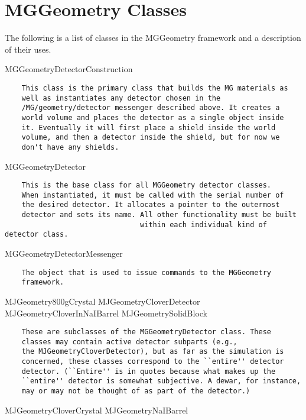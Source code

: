 \section{MGGeometry Classes}

 The following is a list of classes in the MGGeometry framework and
a description of their uses.


MGGeometryDetectorConstruction
 
\begin{lstlisting}
    This class is the primary class that builds the MG materials as
    well as instantiates any detector chosen in the
    /MG/geometry/detector messenger described above. It creates a
    world volume and places the detector as a single object inside
    it. Eventually it will first place a shield inside the world
    volume, and then a detector inside the shield, but for now we
    don't have any shields.
   \end{lstlisting}

MGGeometryDetector

\begin{lstlisting}
    This is the base class for all MGGeometry detector classes.
    When instantiated, it must be called with the serial number of
    the desired detector. It allocates a pointer to the outermost
    detector and sets its name. All other functionality must be built
                                within each individual kind of detector class.
   \end{lstlisting}
MGGeometryDetectorMessenger
 
\begin{lstlisting}
    The object that is used to issue commands to the MGGeometry
    framework.
   \end{lstlisting}
MJGeometry800gCrystal MJGeometryCloverDetector MJGeometryCloverInNaIBarrel MJGeometrySolidBlock
 
\begin{lstlisting}
    These are subclasses of the MGGeometryDetector class. These
    classes may contain active detector subparts (e.g.,
    the MJGeometryCloverDetector), but as far as the simulation is
    concerned, these classes correspond to the ``entire'' detector
    detector. (``Entire'' is in quotes because what makes up the
    ``entire'' detector is somewhat subjective. A dewar, for instance,
    may or may not be thought of as part of the detector.)
   \end{lstlisting}
    MJGeometryCloverCrystal
   MJGeometryNaIBarrel
 
